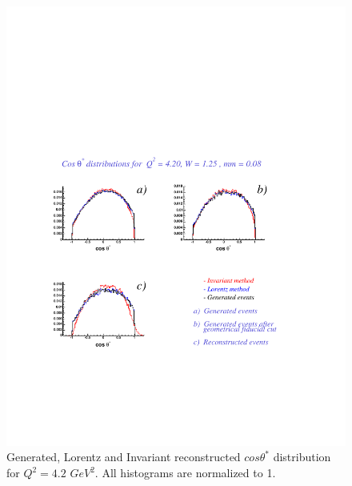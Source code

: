 \begin{figure}[h]
 \begin{center}
  \includegraphics[width = 12cm, bb = 60 140 540 540]{appendix/img/ctheta_q24.20_W1.25_mm0.08}
  \caption{Generated, Lorentz and Invariant reconstructed $cos\theta^*$ distribution for $Q^2=4.2$ $GeV^2$.
           All histograms are normalized to 1.}
 \end{center}
\end{figure} 
